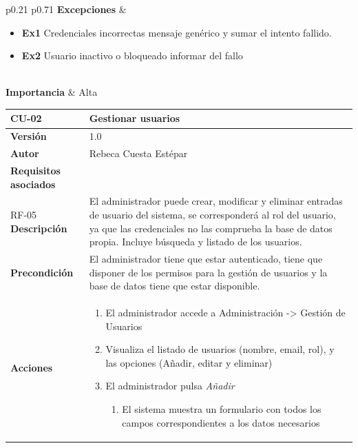 \begin{table}[p]
\begin{tabularx}{\linewidth}{ p{0.21\columnwidth} p{0.71\columnwidth} }
		\textbf{Excepciones}          & 
		\begin{itemize}
			\item\textbf{Ex1} Credenciales incorrectas \textrightarrow{} mensaje genérico y sumar el intento fallido.
			\item\textbf{Ex2} Usuario inactivo o bloqueado \textrightarrow{} informar del fallo
		\end{itemize} \\
		\textbf{Importancia}          & Alta \\
		\bottomrule
	\end{tabularx}
	\caption{CU-01 Inicio de sesión}
\end{table}

\vspace*{-2cm}
\setlength{\textfloatsep}{5pt}
\setlength{\intextsep}{5pt}
\begin{table}[p]
	\centering
	\begin{tabularx}{\linewidth}{ p{} p{} }
		\toprule
		\textbf{CU-02}    & \textbf{Gestionar usuarios}\\
		\toprule
		\textbf{Versión}              & 1.0    \\
		\textbf{Autor}                & Rebeca Cuesta Estépar \\
		\textbf{Requisitos asociados} &  \\ RF-05
		\textbf{Descripción}          & El administrador puede crear, modificar y eliminar entradas de usuario del sistema, se corresponderá al rol del usuario, ya que las credenciales no las comprueba la base de datos propia. Incluye búsqueda y listado de los usuarios. \\
		\textbf{Precondición}         & El administrador tiene que estar autenticado, tiene que disponer de los permisos para la gestión de usuarios y la base de datos tiene que estar disponible. \\
		\textbf{Acciones}             &
		{\small
		\begin{enumerate}
			\def\labelenumi{\arabic{enumi}.}
			\tightlist
			\item El administrador accede a Administración -> Gestión de Usuarios
			\item Visualiza el listado de usuarios (nombre, email, rol), y las opciones (Añadir, editar y eliminar)
			\item El administrador pulsa \emph{Añadir}
			\begin{enumerate}[label*=\arabic*., itemsep=0.5pt, topsep=0.5pt, leftmargin=1em]
				\item El sistema muestra un formulario con todos los campos correspondientes a los datos necesarios

\end{enumerate}
\end{enumerate}}
\end{tabularx}
\end{table}
